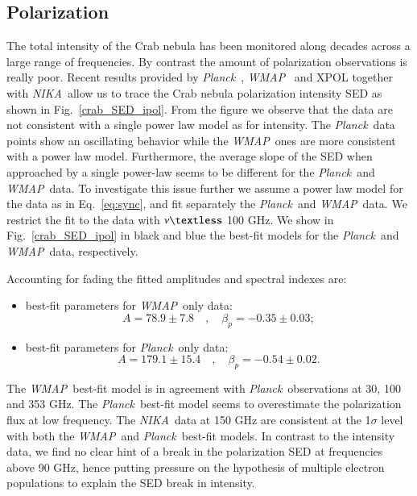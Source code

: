 \documentclass[twocolumn,traditabstract]{aa}
\def\NIKA{\textit{NIKA}}
\def\Planck{\textit{Planck}}
\def\WMAP{\textit{WMAP}}
\begin{document}
\subsection{Polarization}
The total intensity of the Crab nebula has been monitored along decades across a
large range of frequencies. By contrast the amount of polarization observations
is really poor.  Recent results provided by
\Planck\ \citep{2015arXiv150702058P}, \WMAP\ \citep{2011ApJS..192...19W} and
XPOL \citep{aumont2010} together with \NIKA\ allow us to trace the Crab nebula
polarization intensity SED as shown in Fig.~\ref{crab_SED_ipol}.  From the
figure we observe that the data are not consistent with a single power law model
as for intensity.  The \Planck\ data points show an oscillating behavior while
the \WMAP\ ones are more consistent with a power law model. Furthermore, the
average slope of the SED when approached by a single power-law seems to be
different for the \Planck\ and \WMAP\ data.  To investigate this issue further
we assume a power law model for the data as in Eq.~\ref{eq:sync}, and fit
separately the \Planck\ and \WMAP\ data. We restrict the fit to the data with
$\nu \textless$ 100 GHz. We show in Fig.~\ref{crab_SED_ipol} in black and blue
the best-fit models for the \Planck\ and \WMAP\ data, respectively.

Accounting for fading the fitted amplitudes and spectral indexes are:
\begin{itemize}
\item best-fit parameters for \WMAP\ only data:
\begin{equation}
A = 78.9\pm7.8 \quad , \quad \beta_p = -0.35\pm0.03;
\end{equation}
\item best-fit parameters for \Planck\ only data:
\begin{equation}
A = 179.1\pm15.4 \quad , \quad \beta_p = -0.54\pm0.02.
\end{equation}
\end{itemize}

The \WMAP\ best-fit model is in agreement with \Planck\ observations at 30, 100
and 353 GHz.  The \Planck\ best-fit model seems to overestimate the polarization
flux at low frequency.  The \NIKA\ data at 150 GHz are consistent at the
1$\sigma$ level with both the \WMAP\ and \Planck\ best-fit models.  In contrast
to the intensity data, we find no clear hint of a break in the polarization SED
at frequencies above 90 GHz, hence putting pressure on the hypothesis of
  multiple electron populations to explain the SED break in intensity.
\end{document}
